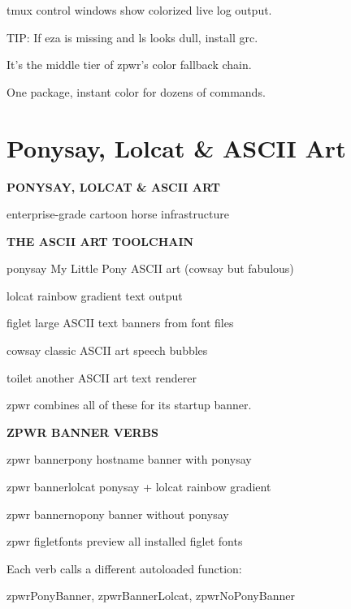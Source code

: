 \documentclass[11pt,a4paper,twoside]{book}
\begin{document}
tmux control windows show colorized live log output.

TIP: If eza is missing and ls looks dull, install grc.

It's the middle tier of zpwr's color fallback chain.

One package, instant color for dozens of commands.


\vspace{16pt}

\section{Ponysay, Lolcat \& ASCII Art}


\vspace{10pt}
{\large\bfseries\color{neoncyan} PONYSAY, LOLCAT \& ASCII ART}\vspace{6pt}

enterprise-grade cartoon horse infrastructure


\vspace{12pt}
{\bfseries\color{neonyellow} THE ASCII ART TOOLCHAIN}\vspace{4pt}

ponysay    My Little Pony ASCII art (cowsay but fabulous)

lolcat     rainbow gradient text output

figlet     large ASCII text banners from font files

cowsay     classic ASCII art speech bubbles

toilet     another ASCII art text renderer

zpwr combines all of these for its startup banner.


\vspace{12pt}
{\bfseries\color{neonyellow} ZPWR BANNER VERBS}\vspace{4pt}

zpwr bannerpony      hostname banner with ponysay

zpwr bannerlolcat    ponysay + lolcat rainbow gradient

zpwr bannernopony    banner without ponysay

zpwr figletfonts     preview all installed figlet fonts

Each verb calls a different autoloaded function:

\begin{codebox}
zpwrPonyBanner, zpwrBannerLolcat, zpwrNoPonyBanner\\
\end{codebox}
\end{document}
